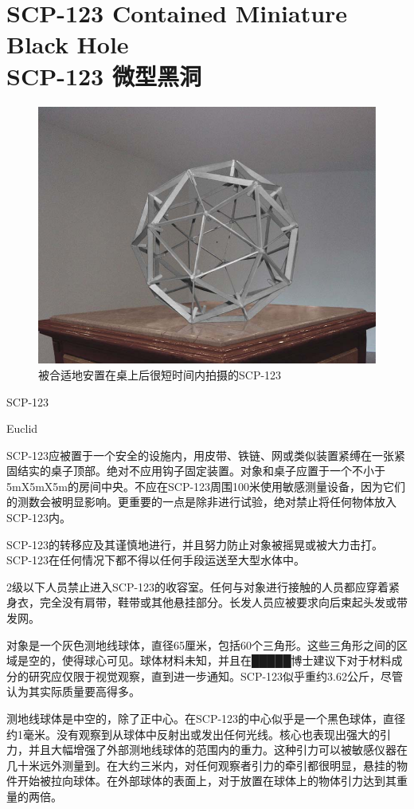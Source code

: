 \chapter[SCP-123 微型黑洞]{
    SCP-123 Contained Miniature Black Hole\\
    SCP-123 微型黑洞
}

\label{chap:SCP-123}

\begin{figure}[H]
    \centering
    \includegraphics[width=0.5\linewidth]{images/SCP-123.jpg}
    \caption*{被合适地安置在桌上后很短时间内拍摄的SCP-123}
\end{figure}

SCP-123

Euclid

SCP-123应被置于一个安全的设施内，用皮带、铁链、网或类似装置紧缚在一张紧固结实的桌子顶部。绝对不应用钩子固定装置。对象和桌子应置于一个不小于5mX5mX5m的房间中央。不应在SCP-123周围100米使用敏感测量设备，因为它们的测数会被明显影响。更重要的一点是除非进行试验，绝对禁止将任何物体放入SCP-123内。

SCP-123的转移应及其谨慎地进行，并且努力防止对象被摇晃或被大力击打。SCP-123在任何情况下都不得以任何手段运送至大型水体中。

2级以下人员禁止进入SCP-123的收容室。任何与对象进行接触的人员都应穿着紧身衣，完全没有肩带，鞋带或其他悬挂部分。长发人员应被要求向后束起头发或带发网。

对象是一个灰色测地线球体，直径65厘米，包括60个三角形。这些三角形之间的区域是空的，使得球心可见。球体材料未知，并且在█████博士建议下对于材料成分的研究应仅限于视觉观察，直到进一步通知。SCP-123似乎重约3.62公斤，尽管认为其实际质量要高得多。

测地线球体是中空的，除了正中心。在SCP-123的中心似乎是一个黑色球体，直径约1毫米。没有观察到从球体中反射出或发出任何光线。核心也表现出强大的引力，并且大幅增强了外部测地线球体的范围内的重力。这种引力可以被敏感仪器在几十米远外测量到。在大约三米内，对任何观察者引力的牵引都很明显，悬挂的物件开始被拉向球体。在外部球体的表面上，对于放置在球体上的物体引力达到其重量的两倍。

